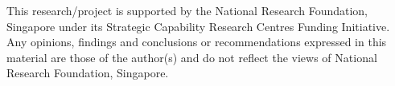 \documentclass{article}
\theoremstyle{definition}
\begin{document}

\begin{ack}
This research/project is supported by the National Research Foundation, Singapore under its Strategic Capability Research Centres Funding Initiative. Any opinions, findings and conclusions or recommendations expressed in this material are those of the author(s) and do not reflect the views of National Research Foundation, Singapore.
\end{ack}

    
    
\end{document}
